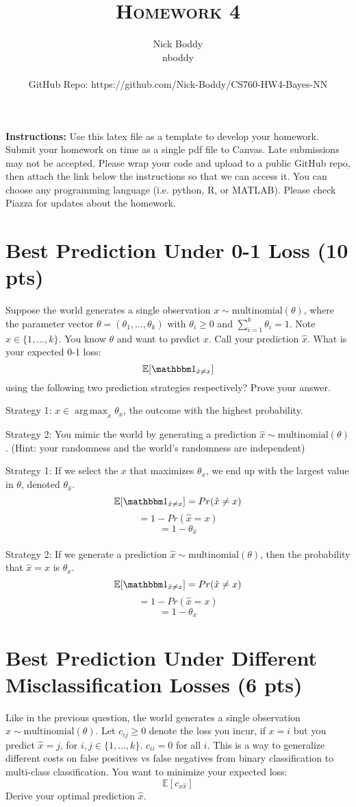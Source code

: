 \documentclass[a4paper]{article}
\title{\textsc{Homework 4}} %
\author{
Nick Boddy\\
nboddy\\ \\
GitHub Repo: https://github.com/Nick-Boddy/CS760-HW4-Bayes-NN \\
}
\date{}
\theoremstyle{definition}
\DeclareMathOperator*{\argmax}{arg\,max}
\def\E{\mathbb E}
\def\ind{\mathbbm 1}
\newenvironment{soln}{
    \leavevmode\color{blue}\ignorespaces
}{}
\begin{document}
\maketitle 


\textbf{Instructions:} Use this latex file as a template to develop your homework. Submit your homework on time as a single pdf file to Canvas. Late submissions may not be accepted. Please wrap your code and upload to a public GitHub repo, then attach the link below the instructions so that we can access it. You can choose any programming language (i.e. python, R, or MATLAB). Please check Piazza for updates about the homework.

\section{Best Prediction Under 0-1 Loss (10 pts)}
Suppose the world generates a single observation $x \sim \mbox{multinomial}(\theta)$, where the parameter vector $\theta=(\theta_1, \ldots, \theta_k)$ with $\theta_i\ge 0$ and $\sum_{i=1}^k \theta_i=1$.  Note $x \in \{1, \ldots, k\}$.
You know $\theta$ and want to predict $x$. 
Call your prediction $\hat x$.  What is your expected 0-1 loss: 
$$\E[\ind_{\hat x \neq x}]$$
using the following two prediction strategies respectively?  Prove your answer.


Strategy 1: $\hat x \in \argmax_x \theta_x$, the outcome with the highest probability.

Strategy 2: You mimic the world by generating a prediction $\hat x \sim \mbox{multinomial}(\theta)$.  (Hint: your randomness and the world's randomness are independent)

\begin{soln}
	Strategy 1: If we select the $x$ that maximizes $\theta_x$, we end up with the largest value in $\theta$, denoted $\theta_{\hat x}$. \\
	$$\E[\ind_{\hat x \neq x}] = Pr(\hat x \neq x)$$
	$$ = 1 - Pr(\hat x = x)$$
	$$ = 1 - \theta_{\hat x}$$ \\
	Strategy 2: If we generate a prediction $\hat x \sim \mbox{multinomial}(\theta)$, then the probability that $\hat x = x$ is $\theta_x$.
	\\
	$$\E[\ind_{\hat x \neq x}] = Pr(\hat x \neq x)$$
	$$ = 1 - Pr(\hat x = x)$$
	$$ = 1 - \theta_{x}$$
\end{soln}


\section{Best Prediction Under Different Misclassification Losses (6 pts)}
Like in the previous question, 
the world generates a single observation $x \sim \mbox{multinomial}(\theta)$.
Let $c_{ij} \ge 0$ denote the loss you incur, if $x=i$ but you predict $\hat x=j$, for $i,j \in \{1, \ldots, k\}$.
$c_{ii}=0$ for all $i$.
This is a way to generalize different costs on false positives vs false negatives from binary classification to multi-class classification.
You want to minimize your expected loss:
$$\E[c_{x \hat x}]$$
Derive your optimal prediction $\hat x$. \\
\end{document}
